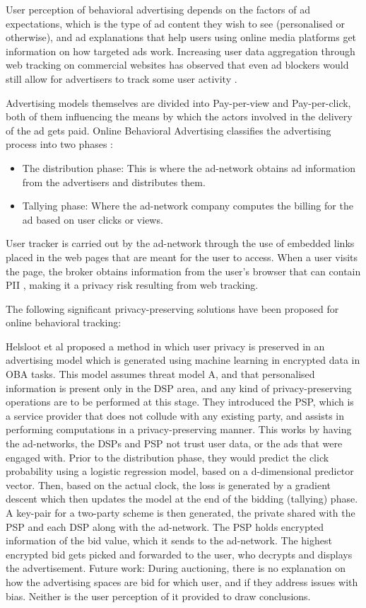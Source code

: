 \documentclass[sigconf,nonacm]{acmart}
\begin{document}
User perception of behavioral advertising depends on the factors of ad expectations, which is the type of ad content they wish to see (personalised or otherwise), and ad explanations that help users using online media platforms get information on how targeted ads work. Increasing user data aggregation through web tracking on commercial websites has observed that even ad blockers would still allow for advertisers to track some user activity \cite{webneverforgets}.

Advertising models themselves are divided into Pay-per-view and Pay-per-click, both of them influencing the means by which the actors involved in the delivery of the ad gets paid. Online Behavioral Advertising classifies the advertising process into two phases \cite{oblivad}:
\begin{itemize}
    \item The distribution phase: This is where the ad-network obtains ad information from the advertisers and distributes them.
    \item Tallying phase: Where the ad-network company computes the billing for the ad based on user clicks or views. 
\end{itemize}
User tracker is carried out by the ad-network through the use of embedded links placed in the web pages that are meant for the user to access. When a user visits the page, the broker obtains information from the user’s browser that can contain PII \cite{oblivad}, making it a privacy risk resulting from web tracking. 

The following significant privacy-preserving solutions have been proposed for online behavioral tracking:

Helsloot et al \cite{ahead} proposed a method in which user privacy is preserved in an advertising model which is generated using machine learning in encrypted data in OBA tasks. This model assumes threat model A, and that personalised information is present only in the DSP area, and any kind of privacy-preserving operations are to be performed at this stage. They introduced the PSP, which is a service provider that does not collude with any existing party, and assists in performing computations in a privacy-preserving manner. This works by having the ad-networks, the DSPs and PSP not trust user data, or the ads that were engaged with. Prior to the distribution phase, they would predict the click probability using a logistic regression model, based on a d-dimensional predictor vector. Then, based on the actual clock, the loss is generated by a gradient descent which then updates the model at the end of the bidding (tallying) phase. A key-pair for a two-party scheme is then generated, the private shared with the PSP and each DSP along with the ad-network. The PSP holds encrypted information of the bid value, which it sends to the ad-network. The highest encrypted bid gets picked and forwarded to the user, who decrypts and displays the advertisement.
 Future work: During auctioning, there is no explanation on how the advertising spaces are bid for which user, and if they address issues with bias. Neither is the user perception of it provided to draw conclusions. 
\end{document}
